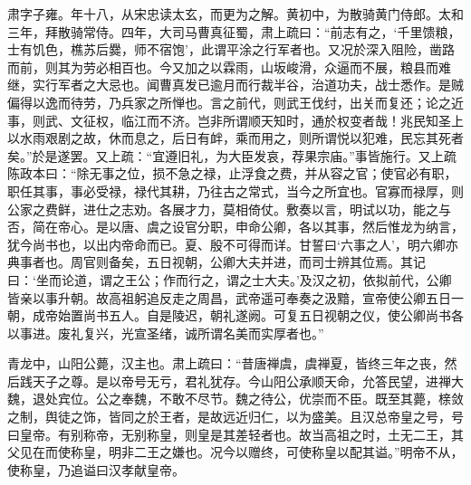 \documentclass[12pt,UTF8]{ctexbook}
\begin{document}
肃字子雍。年十八，从宋忠读太玄，而更为之解。黄初中，为散骑黄门侍郎。太和三年，拜散骑常侍。四年，大司马曹真征蜀，肃上疏曰：“前志有之，‘千里馈粮，士有饥色，樵苏后爨，师不宿饱’，此谓平涂之行军者也。又况於深入阻险，凿路而前，则其为劳必相百也。今又加之以霖雨，山坂峻滑，众逼而不展，粮县而难继，实行军者之大忌也。闻曹真发已逾月而行裁半谷，治道功夫，战士悉作。是贼偏得以逸而待劳，乃兵家之所惮也。言之前代，则武王伐纣，出关而复还；论之近事，则武、文征权，临江而不济。岂非所谓顺天知时，通於权变者哉！兆民知圣上以水雨艰剧之故，休而息之，后日有衅，乘而用之，则所谓悦以犯难，民忘其死者矣。”於是遂罢。又上疏：“宜遵旧礼，为大臣发哀，荐果宗庙。”事皆施行。又上疏陈政本曰：“除无事之位，损不急之禄，止浮食之费，并从容之官；使官必有职，职任其事，事必受禄，禄代其耕，乃往古之常式，当今之所宜也。官寡而禄厚，则公家之费鲜，进仕之志劝。各展才力，莫相倚仗。敷奏以言，明试以功，能之与否，简在帝心。是以唐、虞之设官分职，申命公卿，各以其事，然后惟龙为纳言，犹今尚书也，以出内帝命而已。夏、殷不可得而详。甘誓曰‘六事之人’，明六卿亦典事者也。周官则备矣，五日视朝，公卿大夫并进，而司士辨其位焉。其记曰：‘坐而论道，谓之王公；作而行之，谓之士大夫。’及汉之初，依拟前代，公卿皆亲以事升朝。故高祖躬追反走之周昌，武帝遥可奉奏之汲黯，宣帝使公卿五日一朝，成帝始置尚书五人。自是陵迟，朝礼遂阙。可复五日视朝之仪，使公卿尚书各以事进。废礼复兴，光宣圣绪，诚所谓名美而实厚者也。”

青龙中，山阳公薨，汉主也。肃上疏曰：“昔唐禅虞，虞禅夏，皆终三年之丧，然后践天子之尊。是以帝号无亏，君礼犹存。今山阳公承顺天命，允答民望，进禅大魏，退处宾位。公之奉魏，不敢不尽节。魏之待公，优崇而不臣。既至其薨，榇敛之制，舆徒之饰，皆同之於王者，是故远近归仁，以为盛美。且汉总帝皇之号，号曰皇帝。有别称帝，无别称皇，则皇是其差轻者也。故当高祖之时，土无二王，其父见在而使称皇，明非二王之嫌也。况今以赠终，可使称皇以配其谥。”明帝不从，使称皇，乃追谥曰汉孝献皇帝。
\end{document}
